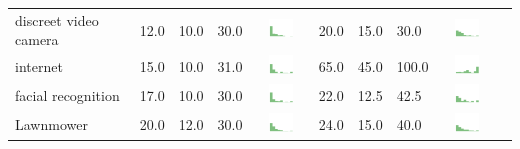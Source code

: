 \begin{table}[t]
\begin{center}
\begin{tabular}{| p{2cm} | p{1cm} | p{1cm} | p{1cm} | c | p{2cm} | p{1cm} | p{1cm} | p{1cm} | c |}
discreet video camera & 12.0 & 10.0 & 30.0 & \includegraphics[width = 2cm, height = 0.5cm]{tables/discreetvideocamerarisk} & 20.0 & 15.0 & 30.0 & \includegraphics[width = 2cm, height = 0.5cm]{tables/discreetvideocameraben} \\ 
internet & 15.0 & 10.0 & 31.0 & \includegraphics[width = 2cm, height = 0.5cm]{tables/internetrisk} & 65.0 & 45.0 & 100.0 & \includegraphics[width = 2cm, height = 0.5cm]{tables/internetben} \\ 
facial recognition & 17.0 & 10.0 & 30.0 & \includegraphics[width = 2cm, height = 0.5cm]{tables/facialrecognitionrisk} & 22.0 & 12.5 & 42.5 & \includegraphics[width = 2cm, height = 0.5cm]{tables/facialrecognitionben} \\ 
Lawnmower & 20.0 & 12.0 & 30.0 & \includegraphics[width = 2cm, height = 0.5cm]{tables/LawnmowerRisk}  & 24.0 & 15.0 & 40.0 & \includegraphics[width = 2cm, height = 0.5cm]{tables/LawnmowerBenefit}\\ 


\end{tabular}
\end{center}
\end{table}
